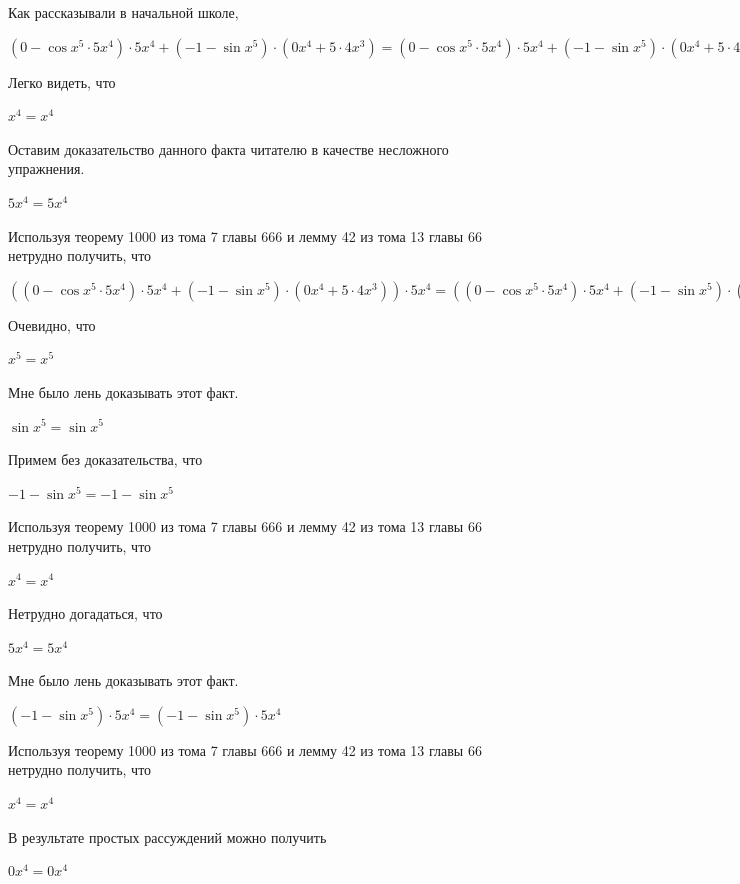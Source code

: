 \documentclass[12pt,a4paper,fleqn]{article}
\theoremstyle{definition}
\begin{document}
Как рассказывали в начальной школе, 

$( 0  - \cos{ x }^{ 5 } \cdot  5 { x }^{ 4 }) \cdot  5 { x }^{ 4 } + ( -1  - \sin{ x }^{ 5 }) \cdot ( 0 { x }^{ 4 } +  5  \cdot  4 { x }^{ 3 }) = ( 0  - \cos{ x }^{ 5 } \cdot  5 { x }^{ 4 }) \cdot  5 { x }^{ 4 } + ( -1  - \sin{ x }^{ 5 }) \cdot ( 0 { x }^{ 4 } +  5  \cdot  4 { x }^{ 3 })$

Легко видеть, что 

${ x }^{ 4 } = { x }^{ 4 }$

Оставим доказательство данного факта читателю в качестве несложного упражнения. 

$ 5 { x }^{ 4 } =  5 { x }^{ 4 }$

Используя теорему 1000 из тома 7 главы 666 и лемму 42 из тома 13 главы 66 нетрудно получить, что 

$(( 0  - \cos{ x }^{ 5 } \cdot  5 { x }^{ 4 }) \cdot  5 { x }^{ 4 } + ( -1  - \sin{ x }^{ 5 }) \cdot ( 0 { x }^{ 4 } +  5  \cdot  4 { x }^{ 3 })) \cdot  5 { x }^{ 4 } = (( 0  - \cos{ x }^{ 5 } \cdot  5 { x }^{ 4 }) \cdot  5 { x }^{ 4 } + ( -1  - \sin{ x }^{ 5 }) \cdot ( 0 { x }^{ 4 } +  5  \cdot  4 { x }^{ 3 })) \cdot  5 { x }^{ 4 }$

Очевидно, что 

${ x }^{ 5 } = { x }^{ 5 }$

Мне было лень доказывать этот факт.

$\sin{ x }^{ 5 } = \sin{ x }^{ 5 }$

Примем без доказательства, что 

$ -1  - \sin{ x }^{ 5 } =  -1  - \sin{ x }^{ 5 }$

Используя теорему 1000 из тома 7 главы 666 и лемму 42 из тома 13 главы 66 нетрудно получить, что 

${ x }^{ 4 } = { x }^{ 4 }$

Нетрудно догадаться, что 

$ 5 { x }^{ 4 } =  5 { x }^{ 4 }$

Мне было лень доказывать этот факт.

$( -1  - \sin{ x }^{ 5 }) \cdot  5 { x }^{ 4 } = ( -1  - \sin{ x }^{ 5 }) \cdot  5 { x }^{ 4 }$

Используя теорему 1000 из тома 7 главы 666 и лемму 42 из тома 13 главы 66 нетрудно получить, что 

${ x }^{ 4 } = { x }^{ 4 }$

В результате простых рассуждений можно получить 

$ 0 { x }^{ 4 } =  0 { x }^{ 4 }$
\end{document}
